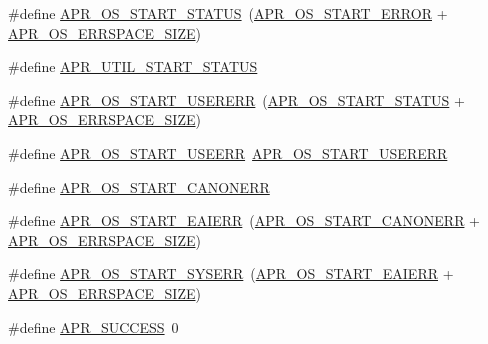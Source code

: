 \begin{DoxyCompactItemize}
\item 
\#define \hyperlink{group__apr__errno_ga450e1a5734732e092ddaa5b67414f69b}{A\+P\+R\+\_\+\+O\+S\+\_\+\+S\+T\+A\+R\+T\+\_\+\+S\+T\+A\+T\+US}~(\hyperlink{group__apr__errno_ga191894048b7bd0cca3cf0bdff1eb695b}{A\+P\+R\+\_\+\+O\+S\+\_\+\+S\+T\+A\+R\+T\+\_\+\+E\+R\+R\+OR} + \hyperlink{group__apr__errno_gadb8d97e6836ccdc57b43b6119a5acccf}{A\+P\+R\+\_\+\+O\+S\+\_\+\+E\+R\+R\+S\+P\+A\+C\+E\+\_\+\+S\+I\+ZE})
\item 
\#define \hyperlink{group__apr__errno_gadf26297a72afa0ea224e7097fe59a1cd}{A\+P\+R\+\_\+\+U\+T\+I\+L\+\_\+\+S\+T\+A\+R\+T\+\_\+\+S\+T\+A\+T\+US}
\item 
\#define \hyperlink{group__apr__errno_gacd35b2de1e38a1fa4717e38d5e153571}{A\+P\+R\+\_\+\+O\+S\+\_\+\+S\+T\+A\+R\+T\+\_\+\+U\+S\+E\+R\+E\+RR}~(\hyperlink{group__apr__errno_ga450e1a5734732e092ddaa5b67414f69b}{A\+P\+R\+\_\+\+O\+S\+\_\+\+S\+T\+A\+R\+T\+\_\+\+S\+T\+A\+T\+US} + \hyperlink{group__apr__errno_gadb8d97e6836ccdc57b43b6119a5acccf}{A\+P\+R\+\_\+\+O\+S\+\_\+\+E\+R\+R\+S\+P\+A\+C\+E\+\_\+\+S\+I\+ZE})
\item 
\#define \hyperlink{group__apr__errno_ga803b8badf8695bdfa4fbcf4d330371f0}{A\+P\+R\+\_\+\+O\+S\+\_\+\+S\+T\+A\+R\+T\+\_\+\+U\+S\+E\+E\+RR}~\hyperlink{group__apr__errno_gacd35b2de1e38a1fa4717e38d5e153571}{A\+P\+R\+\_\+\+O\+S\+\_\+\+S\+T\+A\+R\+T\+\_\+\+U\+S\+E\+R\+E\+RR}
\item 
\#define \hyperlink{group__apr__errno_ga7bca957c11b80b31cb54b0d2cbe9e025}{A\+P\+R\+\_\+\+O\+S\+\_\+\+S\+T\+A\+R\+T\+\_\+\+C\+A\+N\+O\+N\+E\+RR}
\item 
\#define \hyperlink{group__apr__errno_ga2d04991cb57c67a896e22125a1f22b49}{A\+P\+R\+\_\+\+O\+S\+\_\+\+S\+T\+A\+R\+T\+\_\+\+E\+A\+I\+E\+RR}~(\hyperlink{group__apr__errno_ga7bca957c11b80b31cb54b0d2cbe9e025}{A\+P\+R\+\_\+\+O\+S\+\_\+\+S\+T\+A\+R\+T\+\_\+\+C\+A\+N\+O\+N\+E\+RR} + \hyperlink{group__apr__errno_gadb8d97e6836ccdc57b43b6119a5acccf}{A\+P\+R\+\_\+\+O\+S\+\_\+\+E\+R\+R\+S\+P\+A\+C\+E\+\_\+\+S\+I\+ZE})
\item 
\#define \hyperlink{group__apr__errno_gad70a5cad6862a9abcc254d35e827ac8b}{A\+P\+R\+\_\+\+O\+S\+\_\+\+S\+T\+A\+R\+T\+\_\+\+S\+Y\+S\+E\+RR}~(\hyperlink{group__apr__errno_ga2d04991cb57c67a896e22125a1f22b49}{A\+P\+R\+\_\+\+O\+S\+\_\+\+S\+T\+A\+R\+T\+\_\+\+E\+A\+I\+E\+RR} + \hyperlink{group__apr__errno_gadb8d97e6836ccdc57b43b6119a5acccf}{A\+P\+R\+\_\+\+O\+S\+\_\+\+E\+R\+R\+S\+P\+A\+C\+E\+\_\+\+S\+I\+ZE})
\item 
\#define \hyperlink{group__apr__errno_ga9ee311b7bf1c691dc521d721339ee2a6}{A\+P\+R\+\_\+\+S\+U\+C\+C\+E\+SS}~0
\end{DoxyCompactItemize}
